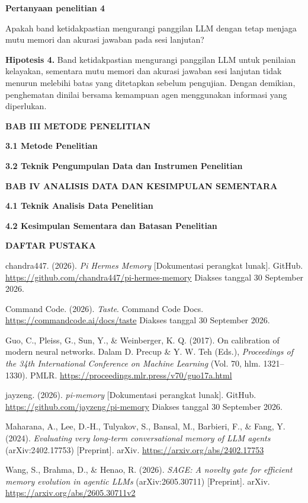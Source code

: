 \documentclass[
]{article}
\begin{document}
\textbf{Pertanyaan penelitian 4}

Apakah band ketidakpastian mengurangi panggilan LLM dengan tetap menjaga mutu memori dan akurasi jawaban pada sesi lanjutan?

\textbf{Hipotesis 4.} Band ketidakpastian mengurangi panggilan LLM untuk penilaian kelayakan, sementara mutu memori dan akurasi jawaban sesi lanjutan tidak menurun melebihi batas yang ditetapkan sebelum pengujian. Dengan demikian, penghematan dinilai bersama kemampuan agen menggunakan informasi yang diperlukan.


\clearpage
\textbf{BAB III METODE PENELITIAN}\label{sec:bab3}

\textbf{3.1 Metode Penelitian}\label{sec:3.1}

\textbf{3.2 Teknik Pengumpulan Data dan Instrumen Penelitian}\label{sec:3.2}

\clearpage
\textbf{BAB IV ANALISIS DATA DAN KESIMPULAN SEMENTARA}\label{sec:bab4}

\textbf{4.1 Teknik Analisis Data Penelitian}\label{sec:4.1}

\textbf{4.2 Kesimpulan Sementara dan Batasan Penelitian}\label{sec:4.2}

\clearpage
\textbf{DAFTAR PUSTAKA}\label{sec:daftar-pustaka}

\begin{list}{}{%
  \setlength{\leftmargin}{0.5in}%
  \setlength{\itemindent}{-0.5in}%
  \setlength{\itemsep}{0.5\baselineskip}%
  \setlength{\parsep}{0pt}%
}
\item chandra447. (2026). \emph{Pi Hermes Memory} [Dokumentasi perangkat lunak].
GitHub. \url{https://github.com/chandra447/pi-hermes-memory}
\newline Diakses tanggal 30 September 2026.

\item Command Code. (2026). \emph{Taste}. Command Code Docs.
\url{https://commandcode.ai/docs/taste}
\newline Diakses tanggal 30 September 2026.

\item Guo, C., Pleiss, G., Sun, Y., \& Weinberger, K. Q. (2017). On
calibration of modern neural networks. Dalam D. Precup \& Y. W. Teh (Eds.),
\emph{Proceedings of the 34th International Conference on Machine Learning}
(Vol. 70, hlm. 1321--1330). PMLR.
\url{https://proceedings.mlr.press/v70/guo17a.html}

\item jayzeng. (2026). \emph{pi-memory} [Dokumentasi perangkat lunak]. GitHub.
\url{https://github.com/jayzeng/pi-memory}
\newline Diakses tanggal 30 September 2026.

\item Maharana, A., Lee, D.-H., Tulyakov, S., Bansal, M., Barbieri, F., \&
Fang, Y. (2024). \emph{Evaluating very long-term conversational memory of LLM
agents} (arXiv:2402.17753) [Preprint]. arXiv.
\url{https://arxiv.org/abs/2402.17753}

\item Wang, S., Brahma, D., \& Henao, R. (2026). \emph{SAGE: A novelty gate for
efficient memory evolution in agentic LLMs} (arXiv:2605.30711) [Preprint]. arXiv.
\url{https://arxiv.org/abs/2605.30711v2}
\end{list}
\end{document}
